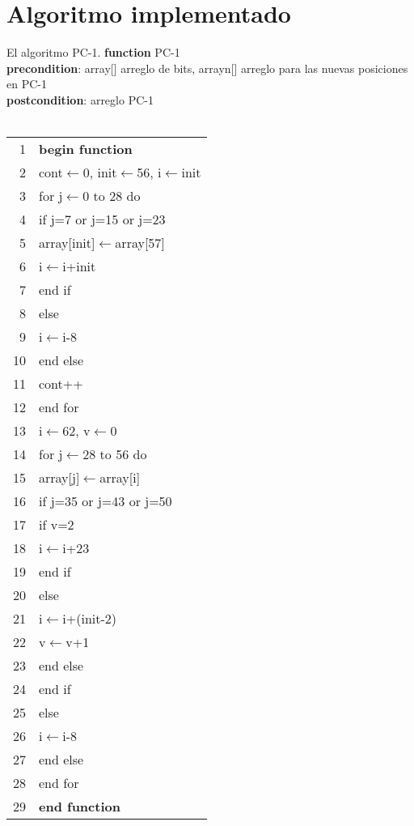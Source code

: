 \documentclass{report}
\newcommand \minitab{\hspace*{15 pt}}
\begin{document}
\section{Algoritmo implementado}
El algoritmo PC-1.
\newline
\newline
{\bf function} PC-1\\
{\bf precondition}: array[] arreglo de bits, arrayn[] arreglo para las nuevas posiciones en PC-1\\
{\bf postcondition}: arreglo PC-1\\
\newline
\newline
~~
\newline
\begin{tabular}{r l}
\\
1 & \bf{begin function} \\
2 & \minitab cont$\leftarrow$0, init$\leftarrow$56, i$\leftarrow$init\\
3 & \minitab for j$\leftarrow$0 to 28 do\\
4 & \minitab \minitab if j=7 or j=15 or j=23\\
5 & \minitab \minitab \minitab array[init]$\leftarrow$array[57]\\
6 & \minitab \minitab \minitab i$\leftarrow$i+init\\
7 & \minitab \minitab end if\\
8 & \minitab \minitab else\\
9 & \minitab \minitab \minitab i$\leftarrow$i-8\\
10 & \minitab \minitab end else\\
11 & \minitab \minitab cont++\\
12 & \minitab end for\\
13 & \minitab i$\leftarrow$62, v$\leftarrow$0\\
14 & \minitab for j$\leftarrow$28 to 56 do\\
15 & \minitab \minitab array[j]$\leftarrow$array[i]\\
16 & \minitab \minitab if j=35 or j=43 or j=50\\
17 & \minitab \minitab \minitab if v=2\\
18 & \minitab \minitab \minitab \minitab i$\leftarrow$i+23\\
19 & \minitab \minitab \minitab end if\\
20 & \minitab \minitab \minitab else\\
21 & \minitab \minitab \minitab \minitab i$\leftarrow$i+(init-2)\\
22 & \minitab \minitab \minitab \minitab v$\leftarrow$v+1\\
23 & \minitab \minitab \minitab end else\\
24 & \minitab \minitab end if\\
25 & \minitab \minitab else\\
26 & \minitab \minitab \minitab i$\leftarrow$i-8\\
27 & \minitab \minitab end else\\
28 & \minitab end for\\
29 & \bf end function
\end{tabular}
\end{document}
